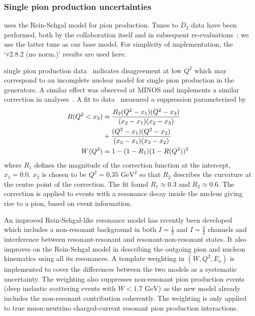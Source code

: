\subsubsection{Single pion production uncertainties}
 uses the Rein-Sehgal model for pion production. Tunes to $D_2$ data have been performed, both by the  collaboration itself and in subsequent re-evaluations~\cite{Rodrigues:2016xjj}; we use the latter tune as our base model. For simplicity of implementation, the `v2.8.2 (no norm.)' results are used here. %

\minerva single pion production data~\cite{Altinok:2017xua,McGivern:2016bwh,Eberly:2014mra} indicates disagreement at low $Q^2$ which may correspond to an incomplete nuclear model for single pion production in the generators. A similar effect was observed at MINOS\cite{minos_pi_q2} 
and \nova implements a similar correction in analyses~\cite{nova_2018}.
A fit to \minerva data~\cite{StowellThesis} measured a suppression parameterized by
\begin{align}
R(Q^2<x_3) & = \frac{R_{2} (Q^2-x_1)(Q^2-x_3)}{(x_2-x_1)(x_2-x_3)} \notag\\
             & + \frac{(Q^2-x_1)(Q^2-x_2)}{(x_3-x_1)(x_3-x_2)}  \\
W(Q^{2}) &= 1-(1-R_{1})(1-R(Q^{2}))^{2}
\end{align}
where $R_{1}$ defines the magnitude of the correction function at the intercept, $x_{1}=0.0$. $x_{2}$ is chosen to be $Q^2=0.35\text{ GeV}^2$ so that $R_{2}$ describes the curvature at the centre point of the correction. The fit found $R_1\approx0.3$ and $R_2\approx0.6$. The correction is applied to events with a resonance decay inside the nucleus giving rise to a pion, based on  event information.

An improved Rein-Sehgal-like resonance model has recently been developed~\cite{minoo} which includes a non-resonant background in both $I=\frac{1}{2}$ and $I=\frac{3}{2}$ channels and interference between resonant-resonant and resonant-non-resonant states. 
It also improves on the Rein-Sehgal model in describing the outgoing pion and nucleon kinematics using all its resonances.
A template weighting in $(W, Q^2, E_\nu)$ is implemented to cover the differences between the two models as a systematic uncertainty. The weighting also suppresses  non-resonant pion production events (deep inelastic scattering events with $W<1.7\text{ GeV}$) as the new model already includes the non-resonant contribution coherently. 
The weighting is only applied to true muon-neutrino charged-current resonant pion production interactions.

